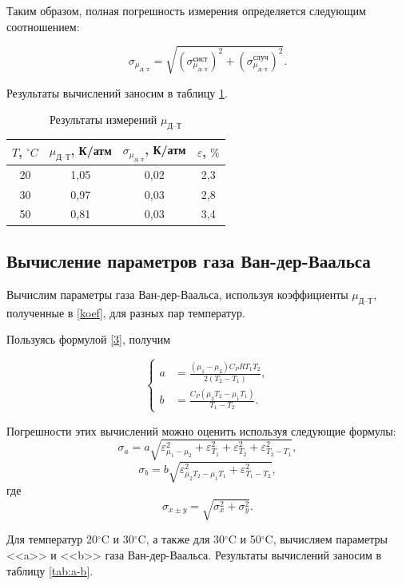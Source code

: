\documentclass[a4paper,12pt]{article} %
\begin{document}
Таким образом, полная погрешность измерения определяется следующим соотношением:

\[ \sigma_{\mu_\text{Д--Т}} = \sqrt{(\sigma_{\mu_\text{Д--Т}}^\text{сист})^2 + (\sigma_{\mu_\text{Д--Т}}^\text{случ})^2}.\]

Результаты вычислений заносим в таблицу \ref{tab:my-table}.
\label{koef}
\begin{table}[H]
	\centering
	\begin{tabular}{|c|c|c|c|}
		\hline
		$ T $, $ ^\circ C $ & $ \mu_\text{Д--Т} $, К/атм & $ \sigma_{\mu_\text{Д--Т}} $, К/атм & $ \varepsilon $, $ \% $ \\ \hline
		20 & 1,05 & 0,02 & 2,3 \\ \hline
		30 & 0,97 & 0,03 & 2,8 \\ \hline
		50 & 0,81 & 0,03 & 3,4 \\ \hline
	\end{tabular}
	\caption{Результаты измерений $ \mu_\text{Д--Т} $}
	\label{tab:my-table}
\end{table}

\subsection{Вычисление параметров газа Ван-дер-Ваальса}

Вычислим параметры газа Ван-дер-Ваальса, используя коэффициенты $ \mu_\text{Д--Т} $, полученные в \ref{koef}, для разных пар температур.

Пользуясь формулой \eqref{3}, получим 

\[ \left\{ \begin{aligned}
	 a &= \frac{\left(\mu_1 - \mu_2\right)C_PRT_1T_2}{2\left(T_2-T_1\right)}, \\
	b &= \frac{C_P(\mu_2T_2-\mu_1T_1)}{T_1-T_2}. \end{aligned} \right. \]

Погрешности этих вычислений можно оценить используя следующие формулы:~\[ \sigma_a = a\sqrt{\varepsilon^2_{\mu_1-\mu_2}+\varepsilon^2_{T_1}+\varepsilon^2_{T_2}+\varepsilon^2_{T_2-T_1}}, \] \[ \sigma_b=b\sqrt{\varepsilon^2_{\mu_2T_2-\mu_1T_1}+\varepsilon^2_{T_1-T_2}}, \] где \[ \sigma_{x\pm y} =\sqrt{\sigma^2_x+\sigma^2_y}. \]

Для температур 20$ ^\circ $C и 30$ ^\circ $C, а также для 30$ ^\circ $C и 50$ ^\circ $C, вычисляем параметры <<a>> и <<b>> газа Ван-дер-Ваальса. Результаты вычислений заносим в таблицу \ref{tab:a-b}.
\end{document}
